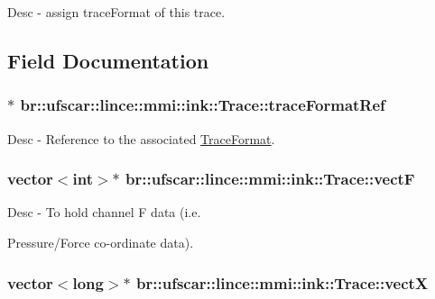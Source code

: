 Desc -\/ assign traceFormat of this trace. 



\subsection{Field Documentation}
\hypertarget{classbr_1_1ufscar_1_1lince_1_1mmi_1_1ink_1_1Trace_a87c33c99c915d0ae5808adf580554c42}{
\subsubsection[{traceFormatRef}]{$\ast$ {\bf br::ufscar::lince::mmi::ink::Trace::traceFormatRef}}}
\label{classbr_1_1ufscar_1_1lince_1_1mmi_1_1ink_1_1Trace_a87c33c99c915d0ae5808adf580554c42}


Desc -\/ Reference to the associated \hyperlink{classbr_1_1ufscar_1_1lince_1_1mmi_1_1ink_1_1TraceFormat}{TraceFormat}. 

\hypertarget{classbr_1_1ufscar_1_1lince_1_1mmi_1_1ink_1_1Trace_ab73af23278fce63da5defb36a2bc5cea}{
\subsubsection[{vectF}]{\setlength{\rightskip}{0pt plus 5cm}vector$<$int$>$$\ast$ {\bf br::ufscar::lince::mmi::ink::Trace::vectF}}}
\label{classbr_1_1ufscar_1_1lince_1_1mmi_1_1ink_1_1Trace_ab73af23278fce63da5defb36a2bc5cea}


Desc -\/ To hold channel F data (i.e. 

Pressure/Force co-\/ordinate data). \hypertarget{classbr_1_1ufscar_1_1lince_1_1mmi_1_1ink_1_1Trace_a9a8d9f9bbffdd49af980bdd7c80ee4ae}{
\subsubsection[{vectX}]{\setlength{\rightskip}{0pt plus 5cm}vector$<$long$>$$\ast$ {\bf br::ufscar::lince::mmi::ink::Trace::vectX}}}
\label{classbr_1_1ufscar_1_1lince_1_1mmi_1_1ink_1_1Trace_a9a8d9f9bbffdd49af980bdd7c80ee4ae}


